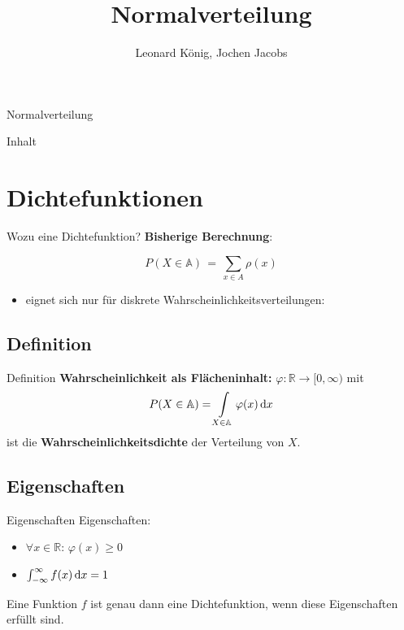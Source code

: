 \documentclass[14pt]{beamer}
\author{Leonard König, Jochen Jacobs}
\title{Normalverteilung}
\institute{Herder Gymnasium Berlin}
\date{}
\begin{document}
\begin{frame}{Normalverteilung}
\titlepage
\end{frame}

\begin{frame}{Inhalt}
\tableofcontents
\end{frame}

\section{Dichtefunktionen}
\begin{frame}{Wozu eine Dichtefunktion?}
\textbf{Bisherige Berechnung}:

{\small $$ P(X \in\mathbb{A}) \, = \, \sum_{x\in A} \rho(x) $$}
\begin{itemize}

\item eignet sich nur für diskrete Wahrscheinlichkeitsverteilungen:

\begin{itemize}
\end{itemize}
\end{itemize}

\end{frame}

\subsection{Definition}
\begin{frame}{Definition}
\textbf{Wahrscheinlichkeit als Flächeninhalt:}
$\varphi \colon \mathbb{R} \rightarrow [0,\infty)$ mit
$$P(X \in \mathbb{A})=\int\displaylimits_{X \in \mathbb{A}} \varphi(x)\,{\mathrm d}x$$
ist die \textbf{Wahrscheinlichkeitsdichte} der Verteilung von $X$.
\end{frame}

\subsection{Eigenschaften}
\begin{frame}{Eigenschaften}
Eigenschaften:
\begin{itemize}
\item $\forall x \in \mathbb{R}:\, \varphi(x)\geq 0$
\item $\int\displaylimits_{-\infty}^\infty f(x)\,{\mathrm d}x = 1$
\end{itemize}
Eine Funktion $f$ ist genau dann eine Dichtefunktion, wenn diese Eigenschaften erfüllt sind.
\end{frame}
\end{document}
